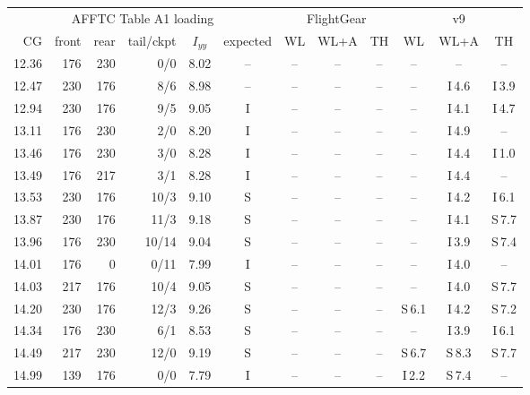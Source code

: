 \begin{tabular}{rrrrcc@{\hspace{1.2em}}ccc@{\hspace{1.2em}}ccc}
\toprule
\multicolumn{6}{c}{AFFTC Table A1 loading} & \multicolumn{3}{c}{FlightGear} & \multicolumn{3}{c}{v9} \\
\cmidrule(lr){1-6}\cmidrule(lr){7-9}\cmidrule(lr){10-12}
CG & front & rear & tail/ckpt & $I_{yy}$ & expected & WL & WL+A & TH & WL & WL+A & TH \\
\midrule
12.36 & 176 & 230 & 0/0 & 8.02 & -- & -- & -- & -- & -- & -- & -- \\
12.47 & 230 & 176 & 8/6 & 8.98 & -- & -- & -- & -- & -- & I\,{\scriptsize 4.6} & I\,{\scriptsize 3.9} \\
12.94 & 230 & 176 & 9/5 & 9.05 & I & -- & -- & -- & -- & I\,{\scriptsize 4.1} & I\,{\scriptsize 4.7} \\
13.11 & 176 & 230 & 2/0 & 8.20 & I & -- & -- & -- & -- & I\,{\scriptsize 4.9} & -- \\
13.46 & 176 & 230 & 3/0 & 8.28 & I & -- & -- & -- & -- & I\,{\scriptsize 4.4} & I\,{\scriptsize 1.0} \\
13.49 & 176 & 217 & 3/1 & 8.28 & I & -- & -- & -- & -- & I\,{\scriptsize 4.4} & -- \\
13.53 & 230 & 176 & 10/3 & 9.10 & S & -- & -- & -- & -- & I\,{\scriptsize 4.2} & I\,{\scriptsize 6.1} \\
13.87 & 230 & 176 & 11/3 & 9.18 & S & -- & -- & -- & -- & I\,{\scriptsize 4.1} & S\,{\scriptsize 7.7} \\
13.96 & 176 & 230 & 10/14 & 9.04 & S & -- & -- & -- & -- & I\,{\scriptsize 3.9} & S\,{\scriptsize 7.4} \\
14.01 & 176 & 0 & 0/11 & 7.99 & I & -- & -- & -- & -- & I\,{\scriptsize 4.0} & -- \\
14.03 & 217 & 176 & 10/4 & 9.05 & S & -- & -- & -- & -- & I\,{\scriptsize 4.0} & S\,{\scriptsize 7.7} \\
14.20 & 230 & 176 & 12/3 & 9.26 & S & -- & -- & -- & S\,{\scriptsize 6.1} & I\,{\scriptsize 4.2} & S\,{\scriptsize 7.2} \\
14.34 & 176 & 230 & 6/1 & 8.53 & S & -- & -- & -- & -- & I\,{\scriptsize 3.9} & I\,{\scriptsize 6.1} \\
14.49 & 217 & 230 & 12/0 & 9.19 & S & -- & -- & -- & S\,{\scriptsize 6.7} & S\,{\scriptsize 8.3} & S\,{\scriptsize 7.7} \\
14.99 & 139 & 176 & 0/0 & 7.79 & I & -- & -- & -- & I\,{\scriptsize 2.2} & S\,{\scriptsize 7.4} & -- \\

\end{tabular}
